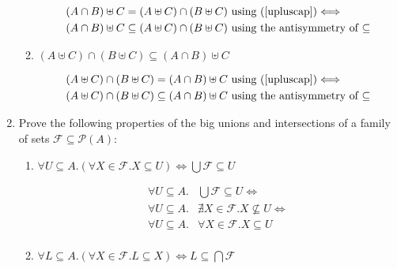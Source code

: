 \documentclass[10pt,\jkfside,a4paper]{article}
\begin{document}
\begin{enumerate}
\begin{enumerate}
\begin{equation}
\begin{split}
(A \cap B) \uplus C &= (A \uplus C) \cap (B \uplus C) \text{ using (\ref{upluscap})} \Longleftrightarrow\\
(A \cap B) \uplus C &\subseteq (A \uplus C) \cap (B \uplus C) \text{ using the antisymmetry of $\subseteq$}\\
\end{split}
\end{equation}

\item $(A \uplus C) \cap (B \uplus C) \subseteq (A \cap B) \uplus C$

\begin{equation}
\begin{split}
(A \uplus C) \cap (B \uplus C) &= (A \cap B) \uplus C \text{ using (\ref{upluscap})} \Longleftrightarrow\\
(A \uplus C) \cap (B \uplus C) &\subseteq (A \cap B) \uplus C \text{ using the antisymmetry of $\subseteq$}\\
\end{split}
\end{equation}

\end{enumerate}

\item Prove the following properties of the big unions and intersections of a family of sets $\mathcal{F}\subseteq \mathcal{P}(A)$:

\begin{enumerate}

\item $\forall U \subseteq A. (\forall X \in \mathcal{F}. X \subseteq U) \Longleftrightarrow \bigcup \mathcal{F}\subseteq U$

\begin{equation}\label{q6part1}
\begin{split}
\forall U \subseteq A.& \bigcup \mathcal{F} \subseteq U \Longleftrightarrow\\
\forall U \subseteq A.& \nexists X \in \mathcal{F}. X \nsubseteq U \Longleftrightarrow\\
\forall U \subseteq A.& \forall X \in \mathcal{F}. X \subseteq U\\
\end{split}
\end{equation}

\item $\forall L \subseteq A. (\forall X \in \mathcal{F}. L \subseteq X) \Longleftrightarrow L \subseteq \bigcap \mathcal{F}$


\end{enumerate}
\end{enumerate}
\end{document}
